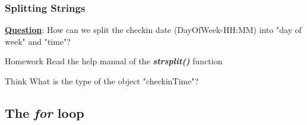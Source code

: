\subsubsection{Splitting Strings}
\noindent \textbf{\underline{Question}}: How can we split the checkin date (DayOfWeek-HH:MM) into "day of week" and "time"?
\begin{knitrout}
\color{fgcolor}\begin{kframe}
\begin{alltt}
 \hlkwb{<-} \hlopt{$} \hlstd{=} \hlstd{)}
\end{alltt}
\end{kframe}
\end{knitrout}

\begin{DIY}{Homework}
\noindent Read the help manual of the \textbf{\emph{strsplit()}} function
\end{DIY}

\begin{DIY}{Think}
\noindent What is the type of the object "checkinTime"? 
\end{DIY}

\newpage
\subsection{The \textbf{\emph{for}} loop}
\begin{HIGHLIGHT}
\par{}
\end{HIGHLIGHT}

